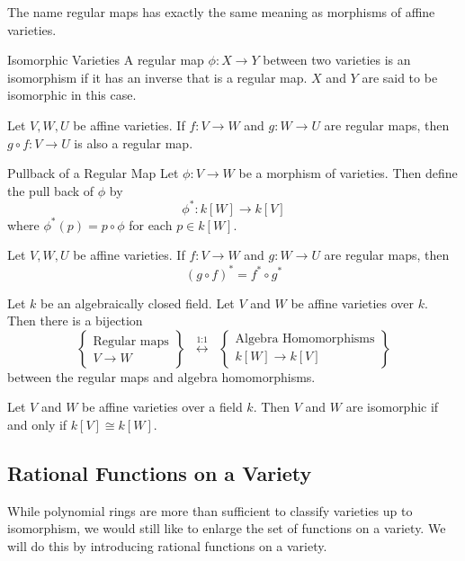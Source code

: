 \documentclass[a4paper]{article}
\begin{document}
The name regular maps has exactly the same meaning as morphisms of affine varieties. 

\begin{defn}{Isomorphic Varieties}{} A regular map $\phi:X\to Y$ between two varieties is an isomorphism if it has an inverse that is a regular map. $X$ and $Y$ are said to be isomorphic in this case. 
\end{defn}

\begin{prp}{}{} Let $V,W,U$ be affine varieties. If $f:V\to W$ and $g:W\to U$ are regular maps, then $g\circ f:V\to U$ is also a regular map. 
\end{prp}

\begin{defn}{Pullback of a Regular Map}{} Let $\phi:V\to W$ be a morphism of varieties. Then define the pull back of $\phi$ by $$\phi^\ast:k[W]\to k[V]$$ where $\phi^\ast(p)=p\circ\phi$ for each $p\in k[W]$. 
\end{defn}

\begin{lmm}{}{} Let $V,W,U$ be affine varieties. If $f:V\to W$ and $g:W\to U$ are regular maps, then $$(g\circ f)^\ast=f^\ast\circ g^\ast$$
\end{lmm}

\begin{prp}{}{} Let $k$ be an algebraically closed field. Let $V$ and $W$ be affine varieties over $k$. Then there is a bijection $$\left\{\substack{\text{Regular maps}\\ V\to W}\right\}\;\;\overset{\text{1:1}}{\longleftrightarrow}\;\;\left\{\substack{\text{Algebra Homomorphisms}\\ k[W]\to k[V]}\right\}$$ between the regular maps and algebra homomorphisms. 
\end{prp}

\begin{crl}{}{} Let $V$ and $W$ be affine varieties over a field $k$. Then $V$ and $W$ are isomorphic if and only if $k[V]\cong k[W]$. 
\end{crl}

\subsection{Rational Functions on a Variety}
While polynomial rings are more than sufficient to classify varieties up to isomorphism, we would still like to enlarge the set of functions on a variety. We will do this by introducing rational functions on a variety. 
\end{document}
